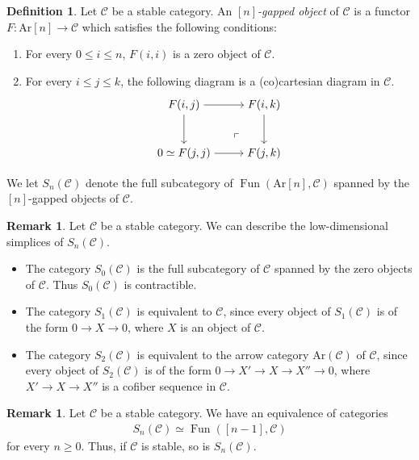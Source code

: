 \documentclass[a4paper,dvipdfmx,11pt,reqno]{amsart}
\DeclareMathOperator{\Fun}{Fun}
\newcommand{\C}{\mathcal{C}}
\newcommand{\Ar}{\mathrm{Ar}}
\theoremstyle{definition}
\newtheorem{definition}[theorem]{Definition}
\newtheorem{remark}[theorem]{Remark}
\begin{document}
\begin{definition}
  Let $\C$ be a stable category.
  An \textit{$[n]$-gapped object} of $\C$ is a functor $F : \Ar[n] \to \C$ which satisfies the following conditions:
  \begin{enumerate}
    \item For every $0 \leq i \leq n$, $F(i,i)$ is a zero object of $\C$.
    \item For every $i \leq j \leq k$, the following diagram is a (co)cartesian diagram in $\C$.
    \[\begin{tikzpicture}[auto,->] 
      \node (tl) at (0,1.5) {$F(i,j)$}; 
      \node (tr) at (2.5,1.5) {$F(i,k)$};
      \node (bl) at (0,0) {$0 \simeq F(j,j)$}; 
      \node (br) at (2.5,0) {$F(j,k)$}; 
      \draw (tl) -- node {} (tr); 
      \draw (bl) -- node[swap] {} (br); 
      \draw (tl) -- node[swap] {} (bl);
      \draw (tr) -- node {} (br); 
      \node at ([xshift=-1.5cm, yshift=0.8cm] br.south east) {$\ulcorner$};
    \end{tikzpicture}\]
  \end{enumerate}
  We let $S_n(\C)$ denote the full subcategory of $\Fun(\Ar[n],\C)$ spanned by the $[n]$-gapped objects of $\C$.
\end{definition}

\begin{remark} \label{Ber.eg.4.1}
  Let $\C$ be a stable category.
  We can describe the low-dimensional simplices of $S_n(\C)$.
  \begin{itemize}
    \item The category $S_0(\C)$ is the full subcategory of $\C$ spanned by the zero objects of $\C$. 
    Thus $S_0(\C)$ is contractible.
    \item The category $S_1(\C)$ is equivalent to $\C$, since every object of $S_1(\C)$ is of the form $0 \to X \to 0$, where $X$ is an object of $\C$.
    \item The category $S_2(\C)$ is equivalent to the arrow category $\Ar(\C)$ of $\C$, since every object of $S_2(\C)$ is of the form $0 \to X' \to X \to X'' \to 0$, where $X' \to X \to X''$ is a cofiber sequence in $\C$. 
  \end{itemize}
\end{remark}

\begin{remark} \label{Ber.rem.4.2}
  Let $\C$ be a stable category.
  We have an equivalence of categories 
  \begin{align*}
    S_n(\C) \simeq \Fun([n-1],\C)
  \end{align*}
  for every $n \geq 0$.
  Thus, if $\C$ is stable, so is $S_n(\C)$.
\end{remark}
\end{document}
